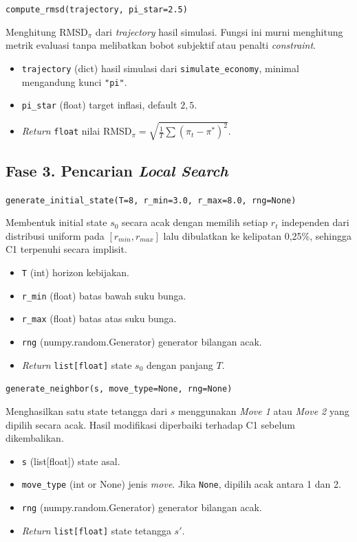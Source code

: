 \texttt{compute\_rmsd(trajectory, pi\_star=2.5)}

Menghitung RMSD$_{\pi}$ dari \textit{trajectory} hasil simulasi. Fungsi ini murni menghitung metrik evaluasi tanpa melibatkan bobot subjektif atau penalti \textit{constraint}.

\begin{itemize}
    \item \texttt{trajectory} (dict) hasil simulasi dari \texttt{simulate\_economy}, minimal mengandung kunci \texttt{"pi"}.
    \item \texttt{pi\_star} (float) target inflasi, default $2{,}5$.
    \item \textit{Return} \texttt{float} nilai RMSD$_{\pi} = \sqrt{\frac{1}{T} \sum (\pi_t - \pi^{*})^{2}}$.
\end{itemize}

\subsection*{Fase 3. Pencarian \textit{Local Search}}

\texttt{generate\_initial\_state(T=8, r\_min=3.0, r\_max=8.0, rng=None)}

Membentuk initial state $s_0$ secara acak dengan memilih setiap $r_t$ independen dari distribusi uniform pada $[r_{min}, r_{max}]$ lalu dibulatkan ke kelipatan 0,25\%, sehingga C1 terpenuhi secara implisit.

\begin{itemize}
    \item \texttt{T} (int) horizon kebijakan.
    \item \texttt{r\_min} (float) batas bawah suku bunga.
    \item \texttt{r\_max} (float) batas atas suku bunga.
    \item \texttt{rng} (numpy.random.Generator) generator bilangan acak.
    \item \textit{Return} \texttt{list[float]} state $s_0$ dengan panjang $T$.
\end{itemize}

\texttt{generate\_neighbor(s, move\_type=None, rng=None)}

Menghasilkan satu state tetangga dari $s$ menggunakan \textit{Move 1} atau \textit{Move 2} yang dipilih secara acak. Hasil modifikasi diperbaiki terhadap C1 sebelum dikembalikan.

\begin{itemize}
    \item \texttt{s} (list[float]) state asal.
    \item \texttt{move\_type} (int or None) jenis \textit{move}. Jika \texttt{None}, dipilih acak antara 1 dan 2.
    \item \texttt{rng} (numpy.random.Generator) generator bilangan acak.
    \item \textit{Return} \texttt{list[float]} state tetangga $s'$.
\end{itemize}

